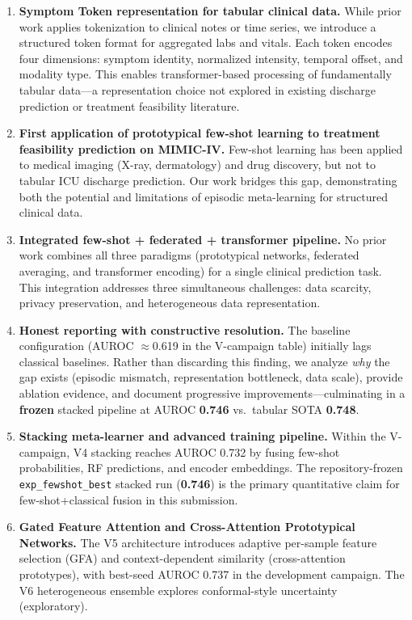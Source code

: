 \begin{enumerate}
\item \textbf{Symptom Token representation for tabular clinical data.} While prior work applies tokenization to clinical notes or time series, we introduce a structured token format for aggregated labs and vitals. Each token encodes four dimensions: symptom identity, normalized intensity, temporal offset, and modality type. This enables transformer-based processing of fundamentally tabular data---a representation choice not explored in existing discharge prediction or treatment feasibility literature.

\item \textbf{First application of prototypical few-shot learning to treatment feasibility prediction on MIMIC-IV.} Few-shot learning has been applied to medical imaging (X-ray, dermatology) and drug discovery, but not to tabular ICU discharge prediction. Our work bridges this gap, demonstrating both the potential and limitations of episodic meta-learning for structured clinical data.

\item \textbf{Integrated few-shot + federated + transformer pipeline.} No prior work combines all three paradigms (prototypical networks, federated averaging, and transformer encoding) for a single clinical prediction task. This integration addresses three simultaneous challenges: data scarcity, privacy preservation, and heterogeneous data representation.

\item \textbf{Honest reporting with constructive resolution.} The baseline configuration (AUROC $\approx$0.619 in the V-campaign table) initially lags classical baselines. Rather than discarding this finding, we analyze \emph{why} the gap exists (episodic mismatch, representation bottleneck, data scale), provide ablation evidence, and document progressive improvements---culminating in a \textbf{frozen} stacked pipeline at AUROC \textbf{0.746} vs.\ tabular SOTA \textbf{0.748}.

\item \textbf{Stacking meta-learner and advanced training pipeline.} Within the V-campaign, V4 stacking reaches AUROC 0.732 by fusing few-shot probabilities, RF predictions, and encoder embeddings. The repository-frozen \texttt{exp\_fewshot\_best} stacked run (\textbf{0.746}) is the primary quantitative claim for few-shot+classical fusion in this submission.

\item \textbf{Gated Feature Attention and Cross-Attention Prototypical Networks.} The V5 architecture introduces adaptive per-sample feature selection (GFA) and context-dependent similarity (cross-attention prototypes), with best-seed AUROC 0.737 in the development campaign. The V6 heterogeneous ensemble explores conformal-style uncertainty (exploratory).


\end{enumerate}
